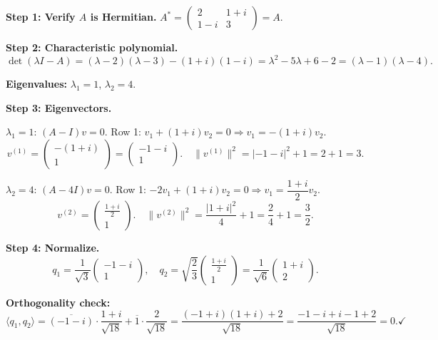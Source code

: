 \documentclass[12pt,a3paper]{article}
\begin{document}
\begin{tcolorbox}[enhanced,breakable,
  colback=cG!4,colframe=cG,boxrule=0.8pt,arc=5pt,
  title={\textbf{Answer --- Unitary Diagonalization of $A=\begin{pmatrix}2&1+i\\1-i&3\end{pmatrix}$}},
  fonttitle=\bfseries\color{white},colbacktitle=cG]
 
\textbf{Step 1: Verify $A$ is Hermitian.}
$A^* = \begin{pmatrix}2&1+i\\1-i&3\end{pmatrix} = A$. \checkmark
 
\textbf{Step 2: Characteristic polynomial.}
\[
\det(\lambda I - A) = (\lambda-2)(\lambda-3)-(1+i)(1-i) = \lambda^2-5\lambda+6-2 = (\lambda-1)(\lambda-4).
\]
 
\textbf{Eigenvalues:} $\lambda_1=1$, $\lambda_2=4$.
 
\textbf{Step 3: Eigenvectors.}
 
$\lambda_1=1$: $(A-I)v=0$. Row 1: $v_1+(1+i)v_2=0 \Rightarrow v_1=-(1+i)v_2$.
\[
v^{(1)}=\begin{pmatrix}-(1+i)\\1\end{pmatrix}=\begin{pmatrix}-1-i\\1\end{pmatrix}.
\quad\|v^{(1)}\|^2 = |{-1-i}|^2+1 = 2+1=3.
\]
 
$\lambda_2=4$: $(A-4I)v=0$. Row 1: $-2v_1+(1+i)v_2=0 \Rightarrow v_1=\dfrac{1+i}{2}v_2$.
\[
v^{(2)}=\begin{pmatrix}\frac{1+i}{2}\\1\end{pmatrix}.
\quad\|v^{(2)}\|^2 = \frac{|1+i|^2}{4}+1=\frac{2}{4}+1=\frac{3}{2}.
\]
 
\textbf{Step 4: Normalize.}
\[
q_1 = \frac{1}{\sqrt{3}}\begin{pmatrix}-1-i\\1\end{pmatrix},\quad
q_2 = \sqrt{\frac{2}{3}}\begin{pmatrix}\frac{1+i}{2}\\1\end{pmatrix} = \frac{1}{\sqrt{6}}\begin{pmatrix}1+i\\2\end{pmatrix}.
\]
 
\textbf{Orthogonality check:}
\[
\langle q_1,q_2\rangle = \overline{(-1-i)}\cdot\frac{1+i}{\sqrt{18}} + \overline{1}\cdot\frac{2}{\sqrt{18}}
= \frac{(-1+i)(1+i)+2}{\sqrt{18}} = \frac{-1-i+i-1+2}{\sqrt{18}} = 0. \checkmark
\]
 

\end{tcolorbox}
\end{document}
